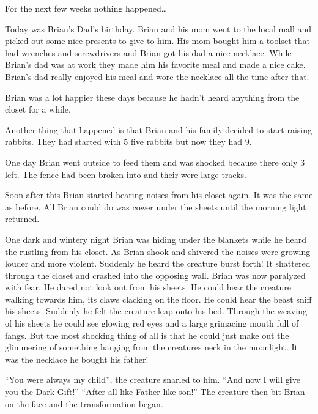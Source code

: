 For the next few weeks nothing happened{\ldots}



Today was Brian's Dad's birthday. Brian and his mom went to the
local mall and picked out some nice presents to give to him. His
mom bought him a toolset that had wrenches and screwdrivers and
Brian got his dad a nice necklace. While Brian's dad was at work
they made him his favorite meal and made a nice cake. Brian's dad
really enjoyed his meal and wore the necklace all the time after
that.



Brian was a lot happier these days because he hadn't heard anything
from the closet for a while.



Another thing that happened is that Brian and his family decided to
start raising rabbits. They had started with 5 five rabbits but now
they had 9.



One day Brian went outside to feed them and was shocked because
there only 3 left. The fence had been broken into and their were
large tracks.



Soon after this Brian started hearing noises from his closet again.
It was the same as before. All Brian could do was cower under the
sheets until the morning light returned.



One dark and wintery night Brian was hiding under the blankets
while he heard the rustling from his closet. As Brian shook and
shivered the noises were growing louder and more violent. Suddenly
he heard the creature burst forth! It shattered through the closet
and crashed into the opposing wall. Brian was now paralyzed with
fear. He dared not look out from his sheets. He could hear the
creature walking towards him, its claws clacking on the floor. He
could hear the beast sniff his sheets. Suddenly he felt the
creature leap onto his bed. Through the weaving of his sheets he
could see glowing red eyes and a large grimacing mouth full of
fangs. But the most shocking thing of all is that he could just
make out the glimmering of something hanging from the creatures
neck in the moonlight. It was the necklace he bought his
father!



``You were always my child'', the creature snarled to him. ``And now I
will give you the Dark Gift!'' ``After all like Father like son!'' The
creature then bit Brian on the face and the transformation began. 


